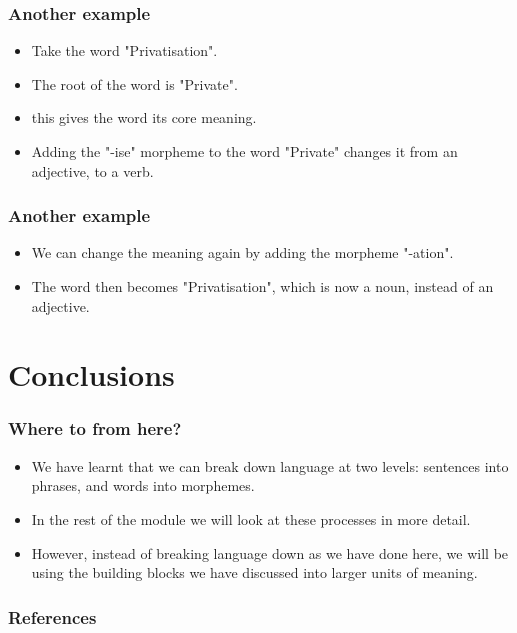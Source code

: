 \documentclass{beamer}
\begin{document}
\begin{frame}

	\frametitle{Another example}
	\begin{itemize}
	\item Take the word "Privatisation".
	\item The root of the word is "Private".
	\item this gives the word its core meaning.
	\item Adding the "-ise" morpheme to the word "Private" changes it from an adjective, to a verb.
	
	
	\end{itemize}
\end{frame}

\begin{frame}
	\frametitle{Another example}
	\begin{itemize}
	\item We can change the meaning again by adding the morpheme "-ation".
	\item The word then becomes "Privatisation", which is now a noun, instead of an adjective.
	\end{itemize}
\end{frame}


\section{Conclusions}

\begin{frame}
	\frametitle{Where to from here?}
	\begin{itemize}
	\item We have learnt that we can break down language at two levels: sentences into phrases, and words into morphemes.
	\item In the rest of the module we will look at these processes in more detail.
	\item However, instead of breaking language down as we have done here, we will be using the building blocks we have discussed into larger units of meaning.
	\end{itemize}

\end{frame}

\begin{frame}[allowframebreaks]
	\frametitle{References}
	
	
\end{frame}
\end{document}
